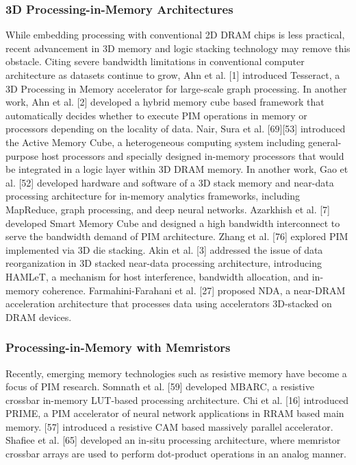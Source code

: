 \documentclass{superfri}
\begin{document}
\subsubsection{3D Processing-in-Memory Architectures}
\label{sec:3D_PiM}
While embedding processing with conventional 2D DRAM chips is less practical, recent advancement in 3D memory and logic stacking technology may remove this obstacle. Citing severe bandwidth limitations in conventional computer architecture as datasets continue to grow, Ahn et al. [1] introduced Tesseract, a 3D Processing in Memory accelerator for large-scale graph processing. In another work, Ahn et al. [2] developed a hybrid memory cube based framework that automatically decides whether to execute PIM operations in memory or processors depending on the locality of data. Nair, Sura et al. [69][53] introduced the Active Memory Cube, a heterogeneous computing system including general-purpose host processors and specially designed in-memory processors that would be integrated in a logic layer within 3D DRAM memory. In another work, Gao et al. [52] developed hardware and software of a 3D stack memory and near-data processing architecture for in-memory analytics frameworks, including MapReduce, graph processing, and deep neural networks. Azarkhish et al. [7] developed Smart Memory Cube and designed a high bandwidth interconnect to serve the bandwidth demand of PIM architecture. Zhang et al. [76] explored PIM implemented via 3D die stacking. Akin et al. [3] addressed the issue of data reorganization in 3D stacked near-data processing architecture, introducing HAMLeT, a mechanism for host interference, bandwidth allocation, and in-memory coherence. Farmahini-Farahani et al. [27] proposed NDA, a near-DRAM acceleration architecture that processes data using accelerators 3D-stacked on DRAM devices.

\subsubsection{Processing-in-Memory with Memristors}
\label{sec:Resistive_PiM}
Recently, emerging memory technologies such as resistive memory have become a focus of PIM research. Somnath et al. ‎[59] developed MBARC, a resistive crossbar in-memory LUT-based processing architecture. Chi et al. ‎[16] introduced PRIME, a PIM accelerator of neural network applications in RRAM based main memory. ‎[57] introduced a resistive CAM based massively parallel accelerator. Shafiee et al. [65] developed an in-situ processing architecture, where memristor crossbar arrays are used to perform dot-product operations in an analog manner. 
\end{document}
